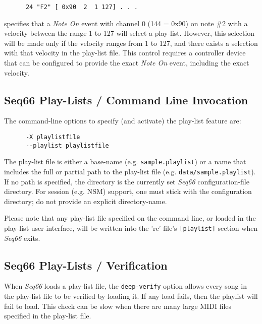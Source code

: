    \begin{verbatim}
      24 "F2" [ 0x90  2  1 127] . . .
   \end{verbatim}

   specifies that a \textsl{Note On} event with channel 0 (144 = 0x90) on note
   \#2 with a velocity between the range 1 to 127 will select a play-list.
   However, this selection will be made only if the velocity ranges from 1 to
   127, and there exists a selection with that velocity in the play-list file.
   This control requires a controller device that can be configured to provide
   the exact \textsl{Note On} event, including the exact velocity.

\subsection{Seq66 Play-Lists / Command Line Invocation}
\label{subsec:playlist_cmd_line}

   The command-line options to specify (and activate) the play-list feature
   are:

   \begin{verbatim}
      -X playlistfile
      --playlist playlistfile
   \end{verbatim}

   The play-list file is either a base-name (e.g. \texttt{sample.playlist})
   or a name that includes the full or partial path to the play-list file
   (e.g. \texttt{data/sample.playlist}).
   If no path is specified, the directory is the currently set
   \textsl{Seq66} configuration-file directory.
   For session (e.g. NSM) support, one must stick with the configuration directory;
   do not provide an explicit directory-name.

   Please note that any play-list file specified on the command line, or loaded
   in the play-list user-interface,
   will be written into the 'rc' file's \texttt{[playlist]} section when
   \textsl{Seq66} exits.

\subsection{Seq66 Play-Lists / Verification}
\label{subsec:playlist_verify}

   When \textsl{Seq66} loads a play-list file, the
   \texttt{deep-verify} option allows every
   song in the play-list file to be verified by loading it.  If any load fails,
   then the playlist will fail to load.  This check can be slow when there are
   many large MIDI files specified in the play-list file.

